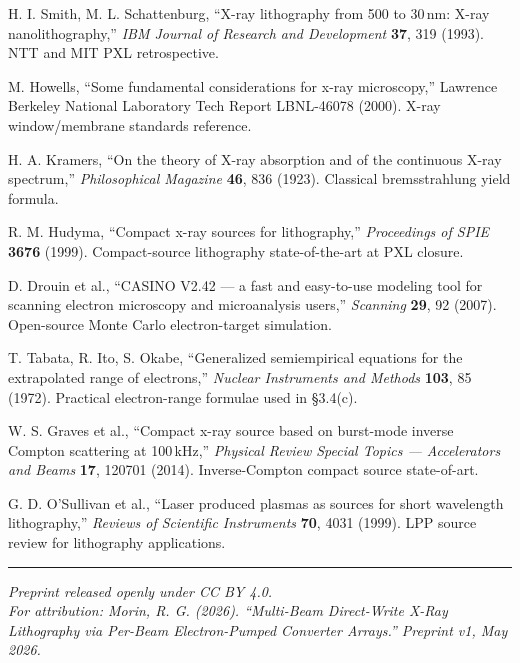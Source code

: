 \documentclass[11pt,letterpaper]{article}
\begin{document}
\begin{enumerate}[leftmargin=2.2em,label={[\arabic*]}]
\item H. I. Smith, M. L. Schattenburg, ``X-ray lithography from 500 to 30\,nm: X-ray nanolithography,'' \textit{IBM Journal of Research and Development} \textbf{37}, 319 (1993). NTT and MIT PXL retrospective.
\item M. Howells, ``Some fundamental considerations for x-ray microscopy,'' Lawrence Berkeley National Laboratory Tech Report LBNL-46078 (2000). X-ray window/membrane standards reference.
\item H. A. Kramers, ``On the theory of X-ray absorption and of the continuous X-ray spectrum,'' \textit{Philosophical Magazine} \textbf{46}, 836 (1923). Classical bremsstrahlung yield formula.
\item R. M. Hudyma, ``Compact x-ray sources for lithography,'' \textit{Proceedings of SPIE} \textbf{3676} (1999). Compact-source lithography state-of-the-art at PXL closure.
\item D. Drouin et al., ``CASINO V2.42 --- a fast and easy-to-use modeling tool for scanning electron microscopy and microanalysis users,'' \textit{Scanning} \textbf{29}, 92 (2007). Open-source Monte Carlo electron-target simulation.
\item T. Tabata, R. Ito, S. Okabe, ``Generalized semiempirical equations for the extrapolated range of electrons,'' \textit{Nuclear Instruments and Methods} \textbf{103}, 85 (1972). Practical electron-range formulae used in \S 3.4(c).
\item W. S. Graves et al., ``Compact x-ray source based on burst-mode inverse Compton scattering at 100\,kHz,'' \textit{Physical Review Special Topics --- Accelerators and Beams} \textbf{17}, 120701 (2014). Inverse-Compton compact source state-of-art.
\item G. D. O'Sullivan et al., ``Laser produced plasmas as sources for short wavelength lithography,'' \textit{Reviews of Scientific Instruments} \textbf{70}, 4031 (1999). LPP source review for lithography applications.
\end{enumerate}

\vspace{1em}\hrule\vspace{0.5em}
\begin{center}
\textit{Preprint released openly under CC BY 4.0.}\\
\textit{For attribution: Morin, R. G. (2026). ``Multi-Beam Direct-Write X-Ray Lithography via Per-Beam Electron-Pumped Converter Arrays.'' Preprint v1, May 2026.}
\end{center}
\end{document}
